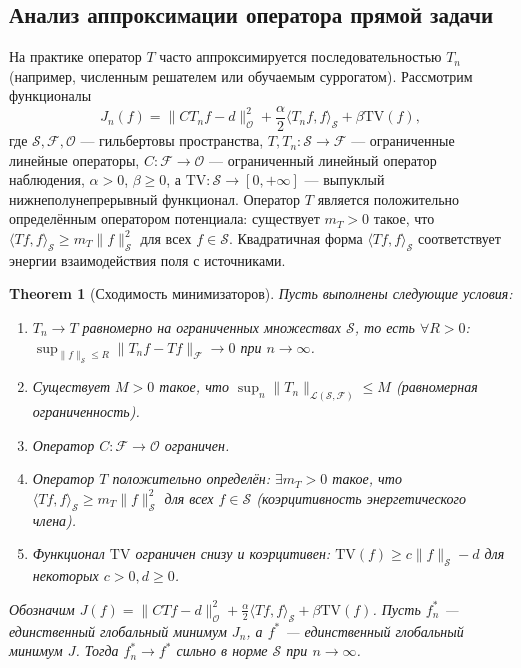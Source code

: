 \documentclass[sn-mathphys-num]{bst/sn-jnl}
\theoremstyle{thmstylethree}
\theoremstyle{thmstyletwo}
\theoremstyle{thmstyleone}
\newtheorem{theorem}{Theorem}
\begin{document}
\subsection{Анализ аппроксимации оператора прямой задачи}

На практике оператор $T$ часто аппроксимируется последовательностью $T_n$ (например, численным решателем или обучаемым суррогатом). Рассмотрим функционалы
\begin{equation}
    J_n(f)=\|C T_n f - d\|_{\mathcal{O}}^2 + \frac{\alpha}{2} \langle T_n f, f\rangle_{\mathcal{S}} + \beta \mathrm{TV}(f),
\end{equation}
где $\mathcal{S}, \mathcal{F}, \mathcal{O}$ — гильбертовы пространства, $T, T_n: \mathcal{S} \to \mathcal{F}$ — ограниченные линейные операторы, $C: \mathcal{F} \to \mathcal{O}$ — ограниченный линейный оператор наблюдения, $\alpha>0$, $\beta\ge0$, а $\mathrm{TV}: \mathcal{S} \to [0,+\infty]$ — выпуклый нижнеполунепрерывный функционал. Оператор $T$ является положительно определённым оператором потенциала: существует $m_T > 0$ такое, что $\langle T f, f\rangle_{\mathcal{S}} \ge m_T \|f\|_{\mathcal{S}}^2$ для всех $f \in \mathcal{S}$. Квадратичная форма $\langle T f, f\rangle_{\mathcal{S}}$ соответствует энергии взаимодействия поля с источниками.

\begin{theorem}[Сходимость минимизаторов]
Пусть выполнены следующие условия:
\begin{enumerate}
    \item $T_n \to T$ равномерно на ограниченных множествах $\mathcal{S}$, то есть $\forall R>0$: $\sup_{\|f\|_{\mathcal{S}} \le R} \|T_n f - T f\|_{\mathcal{F}} \to 0$ при $n\to\infty$.
    \item Существует $M>0$ такое, что $\sup_n \|T_n\|_{\mathcal{L}(\mathcal{S},\mathcal{F})} \le M$ (равномерная ограниченность).
    \item Оператор $C: \mathcal{F} \to \mathcal{O}$ ограничен.
    \item Оператор $T$ положительно определён: $\exists m_T>0$ такое, что $\langle T f, f\rangle_{\mathcal{S}} \ge m_T \|f\|_{\mathcal{S}}^2$ для всех $f \in \mathcal{S}$ (коэрцитивность энергетического члена).
    \item Функционал $\mathrm{TV}$ ограничен снизу и коэрцитивен: $\mathrm{TV}(f) \ge c \|f\|_{\mathcal{S}} - d$ для некоторых $c>0, d\ge0$.
\end{enumerate}
Обозначим $J(f) = \|C T f - d\|_{\mathcal{O}}^2 + \frac{\alpha}{2} \langle T f, f\rangle_{\mathcal{S}} + \beta \mathrm{TV}(f)$.
Пусть $f_n^*$ — единственный глобальный минимум $J_n$, а $f^*$ — единственный глобальный минимум $J$.
Тогда $f_n^* \to f^*$ сильно в норме $\mathcal{S}$ при $n\to\infty$.
\end{theorem}
\end{document}
